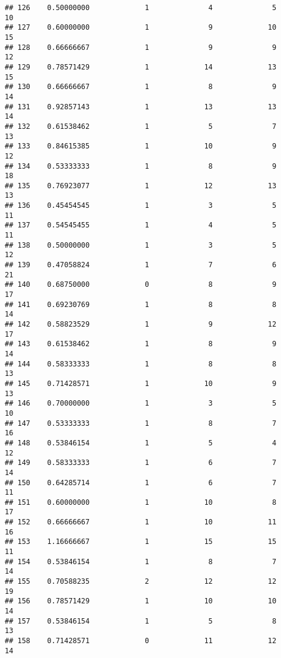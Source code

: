 \documentclass[
]{article}
\begin{document}
\begin{verbatim}
## 126    0.50000000             1              4              5             10
## 127    0.60000000             1              9             10             15
## 128    0.66666667             1              9              9             12
## 129    0.78571429             1             14             13             15
## 130    0.66666667             1              8              9             14
## 131    0.92857143             1             13             13             14
## 132    0.61538462             1              5              7             13
## 133    0.84615385             1             10              9             12
## 134    0.53333333             1              8              9             18
## 135    0.76923077             1             12             13             13
## 136    0.45454545             1              3              5             11
## 137    0.54545455             1              4              5             11
## 138    0.50000000             1              3              5             12
## 139    0.47058824             1              7              6             21
## 140    0.68750000             0              8              9             17
## 141    0.69230769             1              8              8             14
## 142    0.58823529             1              9             12             17
## 143    0.61538462             1              8              9             14
## 144    0.58333333             1              8              8             13
## 145    0.71428571             1             10              9             13
## 146    0.70000000             1              3              5             10
## 147    0.53333333             1              8              7             16
## 148    0.53846154             1              5              4             12
## 149    0.58333333             1              6              7             14
## 150    0.64285714             1              6              7             11
## 151    0.60000000             1             10              8             17
## 152    0.66666667             1             10             11             16
## 153    1.16666667             1             15             15             11
## 154    0.53846154             1              8              7             14
## 155    0.70588235             2             12             12             19
## 156    0.78571429             1             10             10             14
## 157    0.53846154             1              5              8             13
## 158    0.71428571             0             11             12             14

\end{verbatim}
\end{document}
